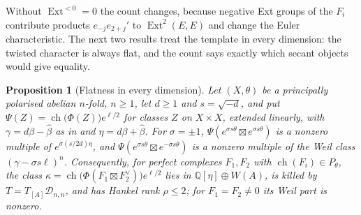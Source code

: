 \documentclass[11pt,reqno]{amsart}
\theoremstyle{plain}
\newtheorem{proposition}[theorem]{Proposition}
\theoremstyle{definition}
\theoremstyle{remark}
\newcommand{\QQ}{\mathbb{Q}}
\newcommand{\cD}{\mathcal{D}}
\newcommand{\HW}{W}                      %
\DeclareMathOperator{\ch}{ch}
\DeclareMathOperator{\Ext}{Ext}
\begin{document}
Without $\Ext^{<0}=0$ the count changes, because negative Ext groups of the
$F_{i}$ contribute products $e_{-j}e_{2+j}'$ to $\Ext^{2}(E,E)$ and change the
Euler characteristic. The next two results treat the template in every
dimension: the twisted character is always flat, and the count says exactly
which secant objects would give equality.

\begin{proposition}[Flatness in every dimension]\label{prop:flatall}
Let $(X,\theta)$ be a principally polarised abelian $n$-fold, $n\ge1$, let
$d\ge1$ and $s=\sqrt{-d}$, and put $\Psi(Z)=\ch\bigl(\Phi(Z)\bigr)e^{\ell/2}$
for classes $Z$ on $X\times X$, extended linearly, with $\gamma=d\beta-\widehat\beta$
as in \cite[Theorem~15.2]{paperI} and $\eta=d\beta+\widehat\beta$. For $\sigma=\pm1$, $\Psi(e^{\sigma s\theta}\boxtimes
e^{\sigma s\theta})$ is a nonzero multiple of $e^{\sigma(s/2d)\eta}$, and
$\Psi(e^{\sigma s\theta}\boxtimes e^{-\sigma s\theta})$ is a nonzero multiple of the
Weil class $(\gamma-\sigma s\ell)^{n}$. Consequently, for perfect complexes
$F_{1},F_{2}$ with $\ch(F_{i})\in P_{\theta}$, the class
$\kappa=\ch\bigl(\Phi(F_{1}\boxtimes F_{2}^{\vee})\bigr)e^{\ell/2}$ lies in
$\QQ[\eta]\oplus\HW(A)$, is killed by $T=T_{[A]}\cD_{n,n}$, and has Hankel rank
$\rho\le2$; for $F_{1}=F_{2}\ne0$ its Weil part is nonzero.
\end{proposition}
\end{document}
